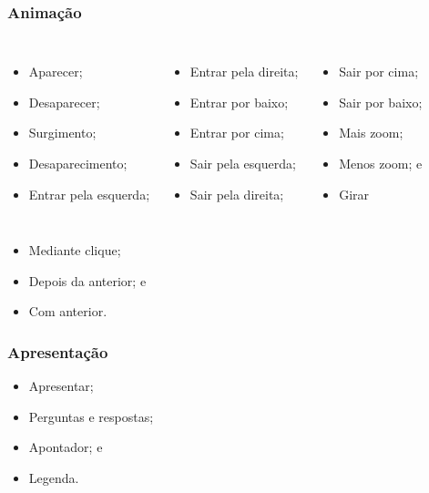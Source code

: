 \documentclass[aspectratio=169]{beamer} %
\begin{document}
\begin{frame}
	\frametitle{Anima\c cão}
	
\begin{columns}[c]
		\begin{itemize}
			\item Aparecer;
			\item Desaparecer;
			\item Surgimento;
			\item Desaparecimento;
			\item Entrar pela esquerda;
		\end{itemize}

		\begin{itemize}
			\item Entrar pela direita;
			\item Entrar por baixo;
			\item Entrar por cima;
			\item Sair pela esquerda;
			\item Sair pela direita;
		\end{itemize}

		\begin{itemize}
			\item Sair por cima;
			\item Sair por baixo;
			\item Mais zoom;
			\item Menos zoom; e
			\item Girar
		\end{itemize}
\end{columns}\vfill

\begin{itemize}
	\item Mediante clique;
	\item Depois da anterior; e
	\item Com anterior.
\end{itemize}	
\end{frame}

\begin{frame}
	\frametitle{Apresenta\c cão}
			
	\begin{itemize}
		\item Apresentar;
		\item Perguntas e respostas;
		\item Apontador; e
		\item Legenda.
	\end{itemize}
\end{frame}
\end{document}
